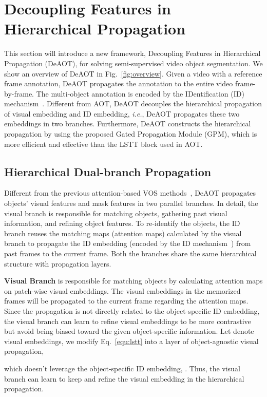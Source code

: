 \documentclass{article}
\def\ie{\emph{i.e.}}
\begin{document}
\section{Decoupling Features in Hierarchical Propagation}
This section will introduce a new framework, Decoupling Features in Hierarchical Propagation (DeAOT), for solving semi-supervised video object segmentation. We show an overview of DeAOT in Fig.~\ref{fig:overview}. Given a video with a reference frame annotation, DeAOT propagates the annotation to the entire video frame-by-frame. The multi-object annotation is encoded by the IDentification (ID) mechanism~\cite{aot}. Different from AOT, DeAOT decouples the hierarchical propagation of visual embedding and ID embedding, \ie, DeAOT propagates these two embeddings in two branches. Furthermore, DeAOT constructs the hierarchical propagation by using the proposed Gated Propagation Module (GPM), which is more efficient and effective than the LSTT block used in AOT.

\subsection{Hierarchical Dual-branch Propagation}
Different from the previous attention-based VOS methods~\cite{spacetime,KMN,hmmn,aot}, DeAOT propagates objects' visual features and mask features in two parallel branches. In detail, the visual branch is responsible for matching objects, gathering past visual information, and refining object features. To re-identify the objects, the ID branch reuses the matching maps (attention maps) calculated by the visual branch to propagate the ID embedding (encoded by the ID mechanism~\cite{aot}) from past frames to the current frame. Both the branches share the same hierarchical structure with  propagation layers.

\noindent\textbf{Visual Branch} is responsible for matching objects by calculating attention maps on patch-wise visual embeddings. The visual embeddings in the memorized frames will be propagated to the current frame regarding the attention maps. Since the propagation is not directly related to the object-specific ID embedding, the visual branch can learn to refine visual embeddings to be more contrastive but avoid being biased toward the given object-specific information. Let  denote visual embeddings, we modify Eq.~\ref{equ:lstt} into a layer of object-agnostic visual propagation,

which doesn't leverage the object-specific ID embedding, . Thus, the visual branch can learn to keep and refine the visual embedding in the hierarchical propagation.
\end{document}
